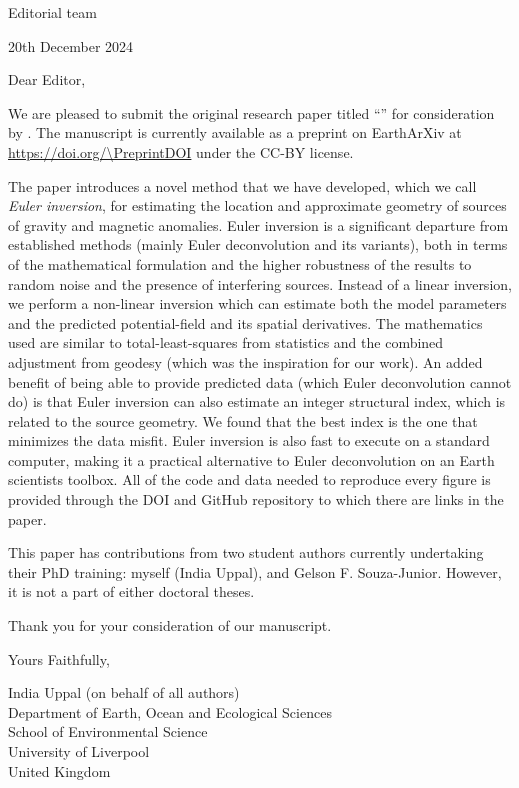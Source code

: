 \documentclass[a4paper,onecolumn,10pt]{article}
\newcommand{\Padding}{\vspace{0.75cm}}
\begin{document}
\begin{flushleft}
    Editorial team
    \\
    \Journal
\end{flushleft}
\begin{flushright}
    20th December 2024
\end{flushright}
\Padding

\noindent
Dear Editor,
\Padding

We are pleased to submit the original research paper titled ``\Title{}'' for
consideration by \Journal{}.
The manuscript is currently available as a preprint on EarthArXiv at
\url{https://doi.org/\PreprintDOI} under the CC-BY license.

The paper introduces a novel method that we have developed, which we call
\textit{Euler inversion}, for estimating the location and approximate geometry
of sources of gravity and magnetic anomalies.
Euler inversion is a significant departure from established methods (mainly
Euler deconvolution and its variants), both in terms of the mathematical
formulation and the higher robustness of the results to random noise and the
presence of interfering sources.
Instead of a linear inversion, we perform a non-linear inversion which can
estimate both the model parameters and the predicted potential-field and its
spatial derivatives.
The mathematics used are similar to total-least-squares from statistics and the
combined adjustment from geodesy (which was the inspiration for our work).
An added benefit of being able to provide predicted data (which Euler
deconvolution cannot do) is that Euler inversion can also estimate an integer
structural index, which is related to the source geometry.
We found that the best index is the one that minimizes the data misfit.
Euler inversion is also fast to execute on a standard computer, making it
a practical alternative to Euler deconvolution on an Earth scientists toolbox.
All of the code and data needed to reproduce every figure is provided through
the DOI and GitHub repository to which there are links in the paper.

This paper has contributions from two student authors currently undertaking
their PhD training: myself (India Uppal), and Gelson F. Souza-Junior.
However, it is not a part of either doctoral theses.
\Padding

Thank you for your consideration of our manuscript.
\Padding

\begin{flushleft}
  Yours Faithfully,
  \Padding

  India Uppal (on behalf of all authors)
  \\[0.25cm]
  {
    \color{mediumgray}
    \small
    Department of Earth, Ocean and Ecological Sciences
    \\
    School of Environmental Science
    \\
    University of Liverpool
    \\
    United Kingdom
  }
\end{flushleft}
\end{document}
